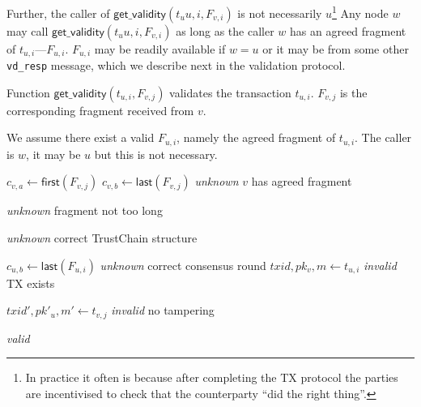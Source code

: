 Further, the caller of $\textsf{get\_validity}(t_u{u, i}, F_{v, i})$ is not necessarily 
$u$\footnote{In practice it often is because after completing the TX protocol the parties are incentivised to check that the counterparty ``did the right thing''.}
Any node $w$ may call $\textsf{get\_validity}(t_u{u, i}, F_{v, i})$ as long as the caller $w$ has an agreed fragment of $t_{u, i}$---$F_{u, i}$.
$F_{u, i}$ may be readily available if $w = u$ or it may be from some other \texttt{vd\_resp} message, which we describe next in the validation protocol.

\begin{algorithm}
\caption{Function $\textsf{get\_validity}(t_{u, i}, F_{v, j})$ validates the transaction $t_{u, i}$.
$F_{v, j}$ is the corresponding fragment received from $v$.}
We assume there exist a valid $F_{u, i}$, namely the agreed fragment of $t_{u, i}$. 
The caller is $w$, it may be $u$ but this is not necessary.
\label{alg:get-validity}

\begin{algorithmic}[1]


    \State $c_{v, a} \gets \textsf{first}(F_{v, j})$
    \State $c_{v, b} \gets \textsf{last}(F_{v, j})$
        \State \Return \emph{unknown}
    \EndIf \Comment $v$ has agreed fragment
    \State

        \State \Return \emph{unknown}
    \EndIf \Comment fragment not too long
    \State

            \State \Return \emph{unknown}
        \EndIf
    \EndIf \Comment correct TrustChain structure
    \State

    \State $c_{u, b} \gets \textsf{last}(F_{u, i})$
        \State \Return \emph{unknown}
    \EndIf \Comment correct consensus round
    \State
    \label{line:valid-fragment}
    \State $txid, pk_v, m \gets t_{u, i}$
        \State \Return \emph{invalid}
    \EndIf \Comment TX exists
    \State 

    \State $txid', pk'_u, m' \gets t_{v, j}$
        \State \Return \emph{invalid}
    \EndIf \Comment no tampering
    \State

    \State \Return \emph{valid}
\end{algorithmic}
\end{algorithm}

